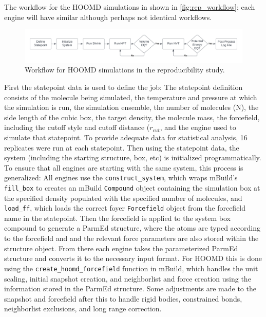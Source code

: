 The workflow for the HOOMD simulations in shown in \autoref{fig:rep_workflow}; each engine will have similar although perhaps not identical workflows.
\begin{figure}[h!]
    \centering
    \includegraphics[width=\linewidth,keepaspectratio]{figures/rep_study/reproducibility_workflow.png}
    \caption{Workflow for HOOMD simulations in the reproducibility study.}\label{fig:rep_workflow}
\end{figure}
First the statepoint data is used to define the job: The statepoint definition consists of the molecule being simulated, the temperature and pressure at which the simulation is run, the simulation ensemble, the number of molecules (N), the side length of the cubic box, the target density, the molecule mass, the forcefield, including the cutoff style and cutoff distance ($r_{cut}$, and the engine used to simulate that statepoint. 
To provide adequate data for statistical analysis, 16 replicates were run at each statepoint.
Then using the statepoint data, the system (including the starting structure, box, etc) is initialized programmatically.
To ensure that all engines are starting with the same system, this process is generalized: All engines use the \lstinline{construct_system}, which wraps mBuild's \lstinline{fill_box} to creates an mBuild \lstinline{Compound} object containing the simulation box at the specified density populated with the specified number of molecules, and \lstinline{load_ff}, which loads the correct foyer \lstinline{Forcefield} object from the forcefield name in the statepoint. 
Then the forcefield is applied to the system box compound to generate a ParmEd structure\cite{Shirts2017}, where the atoms are typed according to the forcefield and and the relevant force parameters are also stored within the structure object. 
From there each engine takes the parameterized ParmEd structure and converts it to the necessary input format. 
For HOOMD this is done using the \lstinline{create_hoomd_forcefield} function in mBuild, which handles the unit scaling, initial snapshot creation, and neighborlist and force creation using the information stored in the ParmEd structure. 
Some adjustments are made to the snapshot and forcefield after this to handle rigid bodies, constrained bonds, neighborlist exclusions, and long range correction. 
